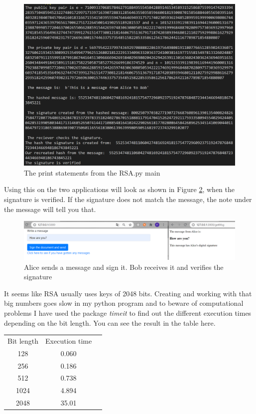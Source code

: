 \documentclass[12pt, letterpaper]{article}
\begin{document}
\begin{figure}[H]
  \includegraphics[width=\linewidth]{code_snippets/print.PNG}\centering
  \caption{The print statements from the RSA.py main}
  \label{fig:print}
\end{figure}

Using this on the two applications will look as shown in Figure \ref{fig:msg}, when the signature is verified. If the signature does not match the message, the note under the message will tell you that.

\begin{figure}[H]
  \hspace*{-50px}\includegraphics[width=500px]{code_snippets/msg.PNG}\centering
  \caption{Alice sends a message and sign it. Bob receives it and verifies the signature}
  \label{fig:msg}
\end{figure}

It seems like RSA usually uses keys of 2048 bits. Creating and working with that big numbers goes slow in my python program and to beware of computational problems I have used the package \textit{timeit} to find out the different execution times depending on the bit length. You can see the result in the table here.

\begin{center}
\begin{tabular}{ |c|c|c| } 
 \hline
 Bit length & Execution time\\
 128 & 0.060 \\ 
 256 & 0.186 \\ 
 512 & 0.738 \\ 
 1024 & 4.894 \\ 
 2048 & 35.01 \\
 \hline
\end{tabular}
\end{center}
\end{document}
